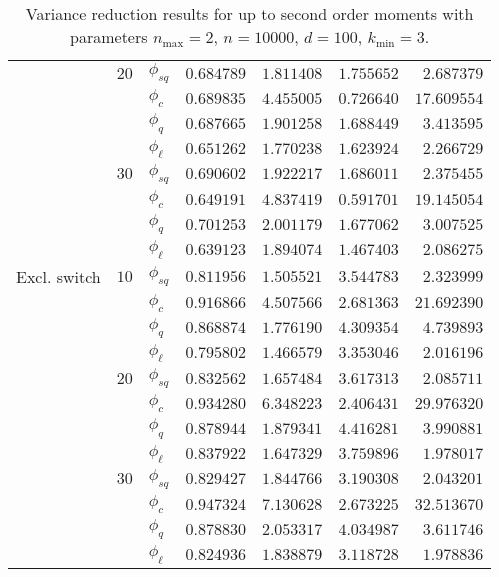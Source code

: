 \begin{table}[]
{\begin{tabular}{l@{\hskip 12pt}l@{\hskip 12pt}l@{\hskip 12pt}r@{\hskip 12pt}r@{\hskip 12pt}r@{\hskip 12pt}r}
            & $20$ &$\phi_{sq}$ &  $0.684789$ &  $1.811408$ &    $1.755652$ &   $2.687379$ \\
            &    &$\phi_{c}$ &  $0.689835$ &  $4.455005$ &    $0.726640$ &  $17.609554$ \\
            &    &$\phi_{q}$ &  $0.687665$ &  $1.901258$ &    $1.688449$ &   $3.413595$ \\
            &    &$\phi_{\ell}$ &  $0.651262$ &  $1.770238$ &    $1.623924$ &   $2.266729$ \\\cmidrule{2-7}
            & $30$ &$\phi_{sq}$ &  $0.690602$ &  $1.922217$ &    $1.686011$ &   $2.375455$ \\
            &    &$\phi_{c}$ &  $0.649191$ &  $4.837419$ &    $0.591701$ &  $19.145054$ \\
            &    &$\phi_{q}$ &  $0.701253$ &  $2.001179$ &    $1.677062$ &   $3.007525$ \\
            &    &$\phi_{\ell}$ &  $0.639123$ &  $1.894074$ &    $1.467403$ &   $2.086275$ \\\midrule
Excl. switch & $10$ &$\phi_{sq}$ &  $0.811956$ &  $1.505521$ &    $3.544783$ &   $2.323999$ \\
            &    &$\phi_{c}$ &  $0.916866$ &  $4.507566$ &    $2.681363$ &  $21.692390$ \\
            &    &$\phi_{q}$ &  $0.868874$ &  $1.776190$ &    $4.309354$ &   $4.739893$ \\
            &    & $\phi_{\ell}$ &  $0.795802$ &  $1.466579$ &    $3.353046$ &   $2.016196$ \\\cmidrule{2-7}
            & $20$ &$\phi_{sq}$ &  $0.832562$ &  $1.657484$ &    $3.617313$ &   $2.085711$ \\
            &    &$\phi_{c}$ &  $0.934280$ &  $6.348223$ &    $2.406431$ &  $29.976320$ \\
            &    &$\phi_{q}$ &  $0.878944$ &  $1.879341$ &    $4.416281$ &   $3.990881$ \\
            &    & $\phi_{\ell}$ &  $0.837922$ &  $1.647329$ &    $3.759896$ &   $1.978017$ \\\cmidrule{2-7}
            & $30$ &$\phi_{sq}$ &  $0.829427$ &  $1.844766$ &    $3.190308$ &   $2.043201$ \\
            &    &$\phi_{c}$ &  $0.947324$ &  $7.130628$ &    $2.673225$ &  $32.513670$ \\
            &    &$\phi_{q}$ &  $0.878830$ &  $2.053317$ &    $4.034987$ &   $3.611746$ \\
            &    & $\phi_{\ell}$ &  $0.824936$ &  $1.838879$ &    $3.118728$ &   $1.978836$ \\
\bottomrule
\end{tabular}}
    \caption[Variance reduction results for up to second order moments]{Variance reduction results for up to second order moments with parameters $n_{\max}=2$, $n=\num{10000}$, $d=100$, $k_{\min}=3$.}
    \label{tab:eff2}
\end{table}
